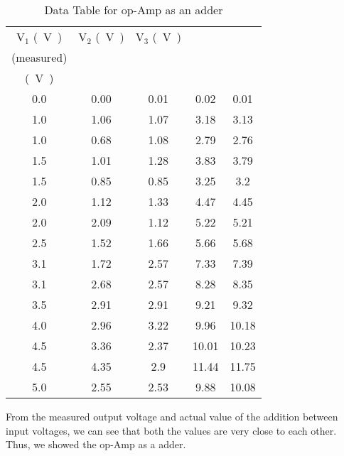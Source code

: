 \documentclass{scrartcl}
\begin{document}
\begin{table}[H]
    \centering
    \begin{tabular}{|c|c|c|c|c|}
    \hline
    $\mathrm{V_1}$ \si{(V)} & $\mathrm{V_2}$ \si{(V)} & $\mathrm{V_3}$ \si{(V)} & \thead{$\mathrm{V_{\text{out}}}\si{(V)}$\\ (measured)} & \thead{$\mathrm{V_1} +\mathrm{V_2}+\mathrm{V_3} $ \\ \si{(V)}} \\ \hline
    0.0    & 0.00    & 0.01 & 0.02 & 0.01 \\ \hline
    1.0    & 1.06 & 1.07 & 3.18 & 3.13 \\ \hline
    1.0    & 0.68 & 1.08 & 2.79 & 2.76 \\ \hline
    1.5  & 1.01 & 1.28 & 3.83 & 3.79 \\ \hline
    1.5  & 0.85 & 0.85 & 3.25 & 3.2  \\ \hline
    2.0    & 1.12 & 1.33 & 4.47 & 4.45 \\ \hline
    2.0    & 2.09 & 1.12 & 5.22 & 5.21 \\ \hline
    2.5  & 1.52 & 1.66 & 5.66 & 5.68 \\ \hline
    3.1  & 1.72 & 2.57 & 7.33 & 7.39 \\ \hline
    3.1  & 2.68 & 2.57 & 8.28 & 8.35 \\ \hline
    3.5  & 2.91 & 2.91 & 9.21 & 9.32 \\ \hline
    4.0    & 2.96 & 3.22 & 9.96 & 10.18 \\ \hline
    4.5  & 3.36 & 2.37 & 10.01 & 10.23 \\ \hline
    4.5  & 4.35 & 2.9  & 11.44 & 11.75 \\ \hline
    5.0    & 2.55 & 2.53 & 9.88 & 10.08 \\ \hline
    \end{tabular}
    \caption{Data Table for op-Amp as an adder}
    \label{tab:voltage_measurements}
    \end{table}
    \noindent
    From the measured output voltage and actual value of the addition between input voltages, we can see that both the values are very close to each other. Thus, we showed the op-Amp as a adder.
\end{document}
